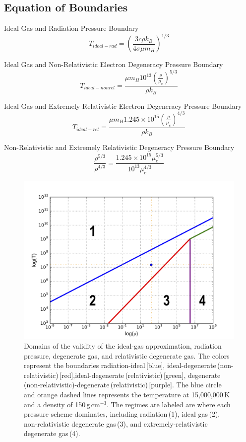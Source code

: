 \documentclass[onecolumn]{aastex6}
\begin{document}
\subsection{Equation of Boundaries}
Ideal Gas and Radiation Pressure Boundary
\begin{equation}
T_{ideal-rad} = \left(\frac{3c\rho k_B}{4 \sigma \mu m_H}\right)^{1/3}
\label{5}
\end{equation}

Ideal Gas and Non-Relativistic Electron Degeneracy Pressure Boundary
\begin{equation}
T_{ideal-nonrel} = \frac{\mu m_H 10^{13} \left(\frac{\rho}{\mu_e}\right)^{5/3}}{\rho k_B}
\label{6}
\end{equation}

Ideal Gas and Extremely Relativistic Electron Degeneracy Pressure Boundary
\begin{equation}
T_{ideal-rel} = \frac{\mu m_H 1.245\times10^{15} \left(\frac{\rho}{\mu_e}\right)^{4/3}}{\rho k_B}
\label{7}
\end{equation}

Non-Relativistic and Extremely Relativistic Degeneracy Pressure Boundary
\begin{equation}
\frac{\rho^{5/3}}{\rho^{4/3}} = \frac{1.245\times10^{15} \mu_e^{5/3}}{10^{13} \mu_e^{4/3}}
\label{8}
\end{equation}




\begin{figure}[ht]
  \centering
  \includegraphics[scale=0.5]{plot4.png}%
  \caption{Domains of the validity of the ideal-gas approximation, radiation pressure, degenerate gas, and relativistic degenerate gas. The colors represent the boundaries radiation-ideal\,[blue], ideal-degenerate\,(non-relativistic)\,[red],ideal-degenerate\,(relativistic)\,[green], degenerate\,(non-relativistic)-degenerate\,(relativistic)\,[purple]. The blue circle and orange dashed lines represents the temperature at 15,000,000\,K and a density of 150\,g\,cm$^{-3}$. The regimes are labeled are where each pressure scheme dominates, including radiation\,(1), ideal gas\,(2), non-relativistic degenerate gas\,(3), and extremely-relativistic degenerate gas\,(4).}
  \label{gasgraph}
\end{figure}
\end{document}
